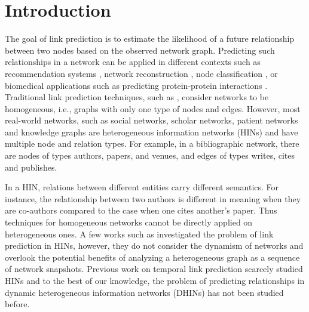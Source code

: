 \section{Introduction}
\label{Sec:Introduction}


The goal of link prediction \cite{liben2007link} is to estimate the likelihood of a future relationship between two nodes based on the observed network graph. Predicting such relationships in a network %
can be applied in different contexts such as recommendation systems 
\cite{chen2005link,song2009scalable,lu2012recommender,li2013recommendation,guy2015social}, network reconstruction \cite{guimera2009missing}, node classification \cite{gallagher2008using}, or biomedical applications such as predicting protein-protein interactions \cite{lei2012novel}. Traditional link prediction techniques, such as \cite{liben2007link}, consider networks to be homogeneous, i.e., graphs with only one type of nodes and edges. However, most real-world networks, such as social networks, scholar networks, patient networks \cite{denny2012mining} and knowledge graphs \cite{wang2015incorporating} are heterogeneous information networks (HINs) \cite{shi2017survey} and have multiple node and relation types. For example, in a bibliographic network, there are nodes of types authors, papers, and venues, and edges of types writes, cites and publishes.

In a HIN, relations between different entities carry different semantics. For instance, the relationship between two authors is different in meaning when they are co-authors compared to the case when one cites another's paper. Thus techniques for homogeneous networks \cite{liben2007link,wang2007local,lichtenwalter2010new,leroy2010cold,al2006link} cannot be directly applied on heterogeneous ones. A few works such as \cite{sun2011ASONAM,Sun:2012:HRP:2124295.2124373} investigated the problem of link prediction in HINs, however, they do not consider the dynamism of networks and overlook the potential benefits of analyzing a heterogeneous graph as a sequence of network snapshots. %
Previous work on temporal link prediction scarcely studied HINs and to the best of our knowledge, the problem of predicting relationships in dynamic heterogeneous information networks (DHINs) has not been studied before. %

